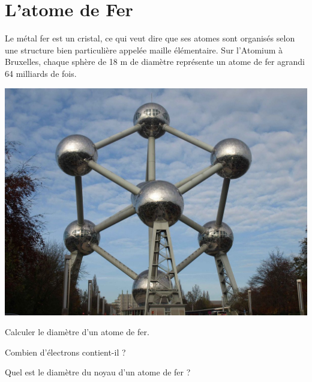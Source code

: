 \section{L'atome de Fer}

\begin{multicols}{2}
	
	
	Le métal fer est un cristal, ce qui veut dire que ses atomes sont organisés selon une structure bien particulière appelée maille élémentaire. Sur l'Atomium à Bruxelles, chaque sphère de 18 m de diamètre représente un atome de fer agrandi 64 milliards de fois.
	
	\includegraphics[scale=0.5]{img/atomium}
\end{multicols}


\begin{questions}
	\question Calculer le diamètre d'un atome de fer.
	\fillwithdottedlines{1.5cm}
	
	\question Combien d'électrons contient-il ?
	\fillwithdottedlines{1.5cm}
	
	\question Quel est le diamètre du noyau d'un atome de fer ?
	\fillwithdottedlines{1.5cm}
\end{questions}

